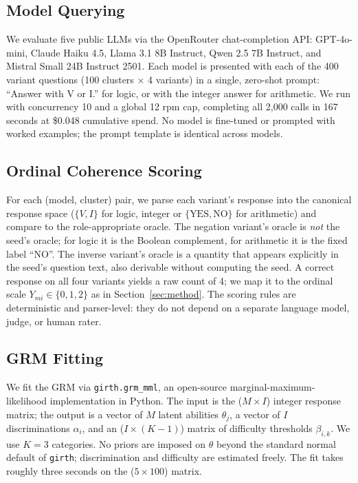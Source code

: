 \documentclass[11pt,letterpaper]{article}
\begin{document}
\subsection{Model Querying}

We evaluate five public LLMs via the OpenRouter chat-completion API: GPT-4o-mini, Claude Haiku 4.5, Llama 3.1 8B Instruct, Qwen 2.5 7B Instruct, and Mistral Small 24B Instruct 2501. Each model is presented with each of the 400 variant questions (100 clusters $\times$ 4 variants) in a single, zero-shot prompt: ``Answer with V or I.'' for logic, or with the integer answer for arithmetic. We run with concurrency 10 and a global 12 rpm cap, completing all 2{,}000 calls in 167 seconds at \$0.048 cumulative spend. No model is fine-tuned or prompted with worked examples; the prompt template is identical across models.

\subsection{Ordinal Coherence Scoring}

For each (model, cluster) pair, we parse each variant's response into the canonical response space ($\{V, I\}$ for logic, integer or $\{\text{YES}, \text{NO}\}$ for arithmetic) and compare to the role-appropriate oracle. The negation variant's oracle is \emph{not} the seed's oracle; for logic it is the Boolean complement, for arithmetic it is the fixed label ``NO''. The inverse variant's oracle is a quantity that appears explicitly in the seed's question text, also derivable without computing the seed. A correct response on all four variants yields a raw count of 4; we map it to the ordinal scale $Y_{mi} \in \{0, 1, 2\}$ as in Section~\ref{sec:method}. The scoring rules are deterministic and parser-level: they do not depend on a separate language model, judge, or human rater.

\subsection{GRM Fitting}

We fit the GRM via \texttt{girth.grm\_mml}, an open-source marginal-maximum-likelihood implementation in Python. The input is the ($M \times I$) integer response matrix; the output is a vector of $M$ latent abilities $\theta_j$, a vector of $I$ discriminations $\alpha_i$, and an ($I \times (K - 1)$) matrix of difficulty thresholds $\beta_{i,k}$. We use $K = 3$ categories. No priors are imposed on $\theta$ beyond the standard normal default of \texttt{girth}; discrimination and difficulty are estimated freely. The fit takes roughly three seconds on the ($5 \times 100$) matrix.
\end{document}
